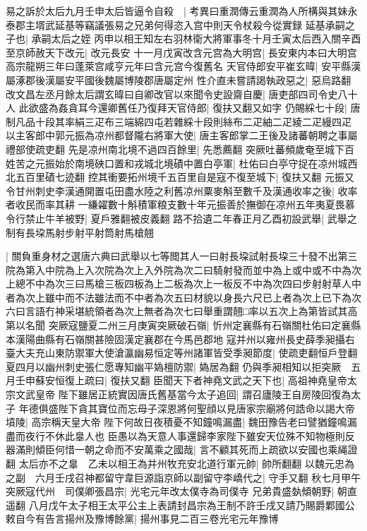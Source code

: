 易之訴於太后九月壬申太后皆逼令自殺　|{
	考異曰重潤傳云重潤為人所構與其妹永泰郡主壻武延基等竊議張易之兄弟何得恣入宫中則天令杖殺今從實録}
延基承嗣之子也|{
	承嗣太后之姪}
丙申以相王知左右羽林衛大將軍事冬十月壬寅太后西入關辛酉至京師赦天下改元|{
	改元長安}
十一月戊寅改含元宫為大明宫|{
	長安東内本曰大明宫高宗龍朔三年曰蓬萊宫咸亨元年曰含元宫今復舊名}
天官侍郎安平崔玄暐|{
	安平縣漢屬涿郡後漢屬安平國後魏屬博陵郡唐屬定州}
性介直未嘗請謁執政惡之|{
	惡烏路翻}
改文昌左丞月餘太后謂玄暐曰自卿改官以來聞令史設齋自慶|{
	唐吏部四司令史八十人}
此欲盛為姦貪耳今還卿舊任乃復拜天官侍郎|{
	復扶又翻又如字}
仍賜綵七十段|{
	唐制凡品十段其率絹三疋布三端綿四屯若雜綵十段則絲布二疋紬二疋綾二疋縵四疋}
以主客郎中郭元振為凉州都督隴右將軍大使|{
	唐主客郎掌二王後及諸蕃朝聘之事屬禮部使疏吏翻}
先是凉州南北境不過四百餘里|{
	先悉薦翻}
突厥吐蕃頻歲奄至城下百姓苦之元振始於南境硤口置和戎城北境磧中置白亭軍|{
	杜佑曰白亭守捉在凉州城西北五百里磧七迹翻}
控其衝要拓州境千五百里自是寇不復至城下|{
	復扶又翻}
元振又令甘州刺史李漢通開置屯田盡水陸之利舊凉州粟麥斛至數千及漢通收率之後|{
	收率者收民而率其耕}
一縑糴數十斛積軍粮支數十年元振善於撫御在凉州五年夷夏畏慕令行禁止牛羊被野|{
	夏戶雅翻被皮義翻}
路不拾遺二年春正月乙酉初設武舉|{
	武舉之制有長垜馬射步射平射筒射馬槍翹}


|{
	關負重身材之選唐六典曰武舉以七等閲其人一曰射長垜試射長垜三十發不出第三院為第入中院為上入次院為次上入外院為次二曰騎射發而並中為上或中或不中為次上總不中為次三曰馬槍三板四板為上二板為次上一板反不中為次四曰步射射草人中者為次上雖中而不法雖法而不中者為次五曰材貌以身長六尺已上者為次上已下為次六曰言語冇神采堪統領者為次上無者為次七曰舉重謂翹□率以五次上為第皆試其高第以名聞}
突厥寇鹽夏二州三月庚寅突厥破石嶺|{
	忻州定襄縣有石嶺關杜佑曰定襄縣本漢陽曲縣有石嶺關甚險固漢定襄郡在今馬邑郡地}
寇并州以雍州長史薛季昶攝右臺大夫充山東防禦軍大使滄瀛幽易恒定等州諸軍皆受季昶節度|{
	使疏吏翻恒戶登翻}
夏四月以幽州刺史張仁愿專知幽平媯檀防禦|{
	媯居為翻}
仍與季昶相知以拒突厥　五月壬申蘇安恒復上疏曰|{
	復扶又翻}
臣聞天下者神堯文武之天下也|{
	高祖神堯皇帝太宗文武皇帝}
陛下雖居正統實因唐氏舊基當今太子追回|{
	謂召廬陵王自房陵回復為太子}
年德俱盛陛下貪其寶位而忘母子深恩將何聖顔以見唐家宗廟將何誥命以謁大帝墳陵|{
	高宗稱天皇大帝}
陛下何故日夜積憂不知鐘鳴漏盡|{
	魏田豫告老曰譬猶鐘鳴漏盡而夜行不休此辠人也}
臣愚以為天意人事還歸李家陛下雖安天位殊不知物極則反器滿則傾臣何惜一朝之命而不安萬乘之國哉|{
	言不顧其死而上疏欲以安國也乘䋲證翻}
太后亦不之辠　乙未以相王為并州牧充安北道行軍元帥|{
	帥所翻翻}
以魏元忠為之副　六月壬戌召神都留守韋巨源詣京師以副留守李嶠代之|{
	守手又翻}
秋七月甲午突厥寇代州　司僕卿張昌宗|{
	光宅元年改太僕寺為司僕寺}
兄弟貴盛埶傾朝野|{
	朝直遥翻}
八月戊午太子相王太平公主上表請封昌宗為王制不許壬戌又請乃賜爵鄴國公敕自今有告言揚州及豫博餘黨|{
	揚州事見二百三卷光宅元年豫博}


